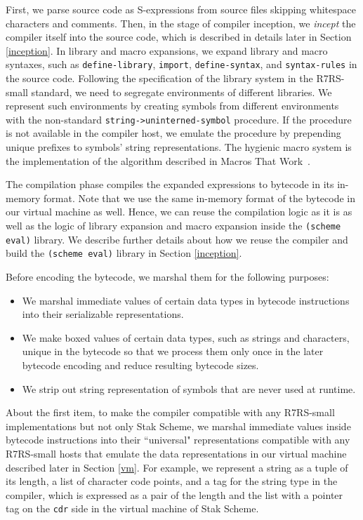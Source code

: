 \documentclass[sigplan]{acmart}
\begin{document}
First, we parse source code as S-expressions from source
files skipping whitespace characters and comments.
Then, in the stage of compiler inception, we \textit{incept} the compiler
itself into the source code, which is described in details later in
Section \ref{inception}.
In library and macro expansions, we expand library and macro
syntaxes, such as \texttt{define-library}, \texttt{import},
\texttt{define-syntax}, and \texttt{syntax-rules} in the source code.
Following the specification of the library system in the R7RS-small
standard, we need to segregate environments of different libraries.
We represent such environments by creating symbols from
different environments with the non-standard
\texttt{string->uninterned-symbol} procedure.
If the procedure is not available in the compiler host, we emulate
the procedure by prepending unique prefixes to symbols' string
representations.
The hygienic macro system is the implementation of the
algorithm described in Macros That Work~\cite{macrosthatwork}.

The compilation phase compiles the expanded expressions to
bytecode in its in-memory format. Note that we use the same
in-memory format of the bytecode in our virtual machine as well.
Hence, we can reuse the compilation logic as it is
as well as the logic of library expansion and macro expansion inside
the \texttt{(scheme eval)} library.
We describe further details about how we reuse the compiler and build
the \texttt{(scheme eval)} library in Section \ref{inception}.

Before encoding the bytecode, we marshal them for the following purposes:

\begin{itemize}
  \item We marshal immediate values of certain data types in bytecode
    instructions into their serializable representations.
  \item We make boxed values of certain data types, such as strings and
    characters, unique in the bytecode so that we process them only once
    in the later bytecode encoding and reduce resulting bytecode sizes.
  \item We strip out string representation of symbols that are never used
    at runtime.
\end{itemize}

About the first item, to make the compiler compatible with any R7RS-small
implementations but not only Stak Scheme, we marshal immediate values
inside bytecode instructions into their ``universal"
representations compatible with any R7RS-small hosts that emulate
the data representations in our virtual machine
described later in Section \ref{vm}.
For example, we represent a string as a tuple of its length, a list of
character code points, and a tag for the string type in the compiler,
which is expressed as a pair of the length and the list
with a pointer tag on the \texttt{cdr} side in the virtual
machine of Stak Scheme.
\end{document}
